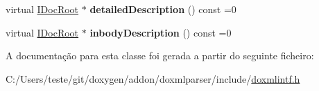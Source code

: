 \begin{DoxyCompactItemize}
\item 
\hypertarget{class_i_member_a3fd3d8b278a1e0787d51861984fdc73e}{virtual \hyperlink{class_i_doc_root}{I\-Doc\-Root} $\ast$ {\bfseries detailed\-Description} () const =0}\label{class_i_member_a3fd3d8b278a1e0787d51861984fdc73e}

\item 
\hypertarget{class_i_member_a5ac08a9c710fb5ef98c48edea3be6d4a}{virtual \hyperlink{class_i_doc_root}{I\-Doc\-Root} $\ast$ {\bfseries inbody\-Description} () const =0}\label{class_i_member_a5ac08a9c710fb5ef98c48edea3be6d4a}

\end{DoxyCompactItemize}


A documentação para esta classe foi gerada a partir do seguinte ficheiro\-:\begin{DoxyCompactItemize}
\item 
C\-:/\-Users/teste/git/doxygen/addon/doxmlparser/include/\hyperlink{include_2doxmlintf_8h}{doxmlintf.\-h}\end{DoxyCompactItemize}
